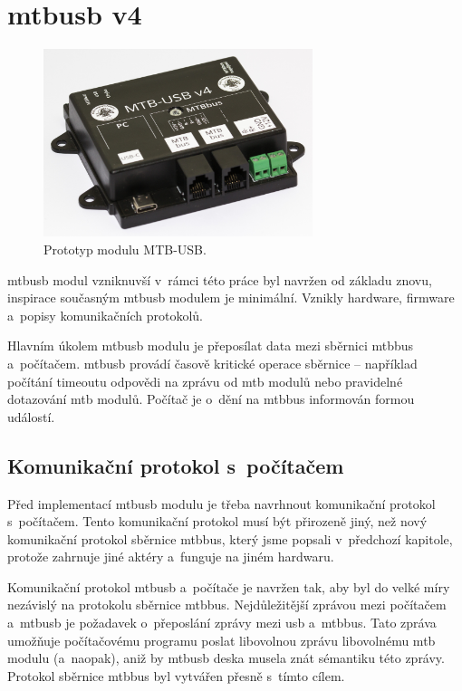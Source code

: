\section{\gls{mtbusb} v4}

\begin{figure}[ht]
\includegraphics[width=0.7\textwidth]{data/usb-all.jpg}
\caption{Prototyp modulu MTB-USB.}
\label{fig:mtbusb-prototype}
\end{figure}

\gls{mtbusb} modul vzniknuvší v~rámci této práce byl navržen od základu znovu,
inspirace současným \gls{mtbusb} modulem je minimální. Vznikly hardware,
firmware a~popisy komunikačních protokolů.

Hlavním úkolem \gls{mtbusb} modulu je přeposílat data mezi sběrnici \gls{mtbbus}
a~počítačem. \gls{mtbusb} provádí časově kritické operace sběrnice – například
počítání timeoutu odpovědi na zprávu od \gls{mtb} modulů nebo pravidelné
dotazování \gls{mtb} modulů. Počítač je o~dění na \gls{mtbbus} informován
formou událostí.

\subsection{Komunikační protokol s~počítačem}

Před implementací \gls{mtbusb} modulu je třeba navrhnout komunikační protokol
s~počítačem. Tento komunikační protokol musí být přirozeně jiný, než nový
komunikační protokol sběrnice \gls{mtbbus}, který jsme popsali v~předchozí
kapitole, protože zahrnuje jiné aktéry a~funguje na jiném hardwaru.

Komunikační protokol \gls{mtbusb} a~počítače je navržen tak, aby byl do velké
míry nezávislý na protokolu sběrnice \gls{mtbbus}. Nejdůležitější zprávou mezi
počítačem a~\gls{mtbusb} je požadavek o~přeposlání zprávy mezi \gls{usb}
a~\gls{mtbbus}. Tato zpráva umožňuje počítačovému programu poslat libovolnou
zprávu libovolnému \gls{mtb} modulu (a~naopak), aniž by \gls{mtbusb} deska
musela znát sémantiku této zprávy. Protokol sběrnice \gls{mtbbus} byl
vytvářen přesně s~tímto cílem.

